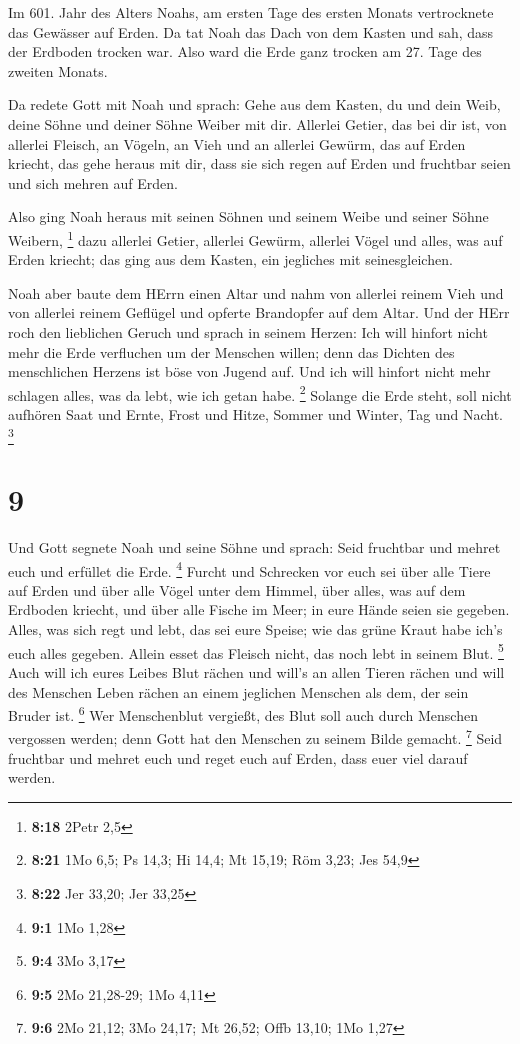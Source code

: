  Im 601. Jahr des Alters Noahs, am ersten Tage des ersten
Monats vertrocknete das Gewässer auf Erden. Da tat Noah das Dach von dem
Kasten und sah, dass der Erdboden trocken war.  Also ward
die Erde ganz trocken am 27. Tage des zweiten Monats.

 Da redete Gott mit Noah und sprach:  Gehe aus
dem Kasten, du und dein Weib, deine Söhne und deiner Söhne Weiber mit
dir.  Allerlei Getier, das bei dir ist, von allerlei
Fleisch, an Vögeln, an Vieh und an allerlei Gewürm, das auf Erden
kriecht, das gehe heraus mit dir, dass sie sich regen auf Erden und
fruchtbar seien und sich mehren auf Erden.

 Also ging Noah heraus mit seinen Söhnen und seinem Weibe
und seiner Söhne Weibern, \footnote{\textbf{8:18} 2Petr 2,5}
 dazu allerlei Getier, allerlei Gewürm, allerlei Vögel und
alles, was auf Erden kriecht; das ging aus dem Kasten, ein jegliches mit
seinesgleichen.

 Noah aber baute dem HErrn einen Altar und nahm von
allerlei reinem Vieh und von allerlei reinem Geflügel und opferte
Brandopfer auf dem Altar.  Und der HErr roch den lieblichen
Geruch und sprach in seinem Herzen: Ich will hinfort nicht mehr die Erde
verfluchen um der Menschen willen; denn das Dichten des menschlichen
Herzens ist böse von Jugend auf. Und ich will hinfort nicht mehr
schlagen alles, was da lebt, wie ich getan habe. \footnote{\textbf{8:21}
  1Mo 6,5; Ps 14,3; Hi 14,4; Mt 15,19; Röm 3,23; Jes 54,9} 
Solange die Erde steht, soll nicht aufhören Saat und Ernte, Frost und
Hitze, Sommer und Winter, Tag und Nacht. \footnote{\textbf{8:22} Jer
  33,20; Jer 33,25}

\hypertarget{section-2}{%
\section{9}\label{section-2}}

 Und Gott segnete Noah und seine Söhne und sprach: Seid
fruchtbar und mehret euch und erfüllet die Erde. \footnote{\textbf{9:1}
  1Mo 1,28}  Furcht und Schrecken vor euch sei über alle
Tiere auf Erden und über alle Vögel unter dem Himmel, über alles, was
auf dem Erdboden kriecht, und über alle Fische im Meer; in eure Hände
seien sie gegeben.  Alles, was sich regt und lebt, das sei
eure Speise; wie das grüne Kraut habe ich's euch alles gegeben.
 Allein esset das Fleisch nicht, das noch lebt in seinem
Blut. \footnote{\textbf{9:4} 3Mo 3,17}  Auch will ich eures
Leibes Blut rächen und will's an allen Tieren rächen und will des
Menschen Leben rächen an einem jeglichen Menschen als dem, der sein
Bruder ist. \footnote{\textbf{9:5} 2Mo 21,28-29; 1Mo 4,11} 
Wer Menschenblut vergießt, des Blut soll auch durch Menschen vergossen
werden; denn Gott hat den Menschen zu seinem Bilde gemacht. \footnote{\textbf{9:6}
  2Mo 21,12; 3Mo 24,17; Mt 26,52; Offb 13,10; 1Mo 1,27} 
Seid fruchtbar und mehret euch und reget euch auf Erden, dass euer viel
darauf werden.

